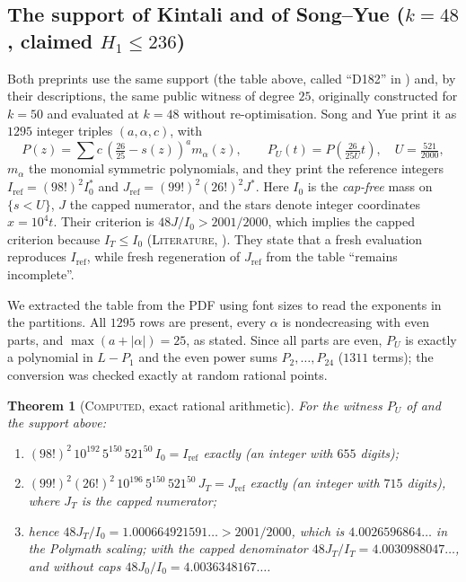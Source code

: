 \documentclass[11pt]{amsart}
\newtheorem{theorem}{Theorem}
\theoremstyle{definition}
\theoremstyle{remark}
\newcommand{\lbl}[1]{\textup{\textsc{#1}}}
\begin{document}
\subsection*{The support of Kintali and of Song--Yue ($k=48$, claimed $H_1\le236$)}
Both preprints use the same support (the table above, called ``D182'' in
\cite{Kin26}) and, by their descriptions, the same public witness of degree
$25$, originally constructed for $k=50$ and evaluated at $k=48$ without
re-optimisation. Song and Yue print it as $1295$ integer triples
$(a,\alpha,c)$, with
\[
P(z)=\sum c\,\left(\tfrac{26}{25}-s(z)\right)^a m_\alpha(z),\qquad
P_U(t)=P\!\left(\tfrac{26}{25U}t\right),\quad U=\tfrac{521}{2000},
\]
$m_\alpha$ the monomial symmetric polynomials, and they print the reference
integers $I_{\mathrm{ref}}=(98!)^2I_0^\ast$ and
$J_{\mathrm{ref}}=(99!)^2(26!)^2J^\ast$. Here $I_0$ is the \emph{cap-free} mass
on $\{s<U\}$, $J$ the capped numerator, and the stars denote integer
coordinates $x=10^4t$. Their criterion is $48J/I_0>2001/2000$, which implies
the capped criterion because $I_T\le I_0$ (\lbl{Literature},
\cite[\S4.12, App.~A, App.~C]{SY26}). They state that a fresh evaluation
reproduces $I_{\mathrm{ref}}$, while fresh regeneration of $J_{\mathrm{ref}}$
from the table ``remains incomplete''.

We extracted the table from the PDF using font sizes to read the exponents in
the partitions. All $1295$ rows are present, every $\alpha$ is nondecreasing
with even parts, and $\max(a+|\alpha|)=25$, as stated. Since all parts are
even, $P_U$ is exactly a polynomial in $L-P_1$ and the even power sums
$P_2,\dots,P_{24}$ ($1311$ terms); the conversion was checked exactly at random
rational points.

\begin{theorem}[\lbl{Computed}, exact rational arithmetic]\label{thm:sy}
For the witness $P_U$ of \cite{SY26} and the support above:
\begin{enumerate}
\item $(98!)^2\,10^{192}\,5^{150}\,521^{50}\,I_0=I_{\mathrm{ref}}$ exactly
(an integer with $655$ digits);
\item $(99!)^2(26!)^2\,10^{196}\,5^{150}\,521^{50}\,J_T=J_{\mathrm{ref}}$
exactly (an integer with $715$ digits), where $J_T$ is the capped numerator;
\item hence $48J_T/I_0=1.000664921591\ldots>2001/2000$, which is
$4.0026596864\ldots$ in the Polymath scaling; with the capped denominator
$48J_T/I_T=4.0030988047\ldots$, and without caps $48J_0/I_0=4.0036348167\ldots$.
\end{enumerate}
\end{theorem}
\end{document}
